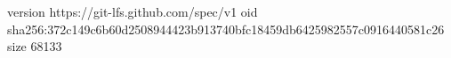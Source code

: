version https://git-lfs.github.com/spec/v1
oid sha256:372c149c6b60d2508944423b913740bfc18459db6425982557c0916440581c26
size 68133
